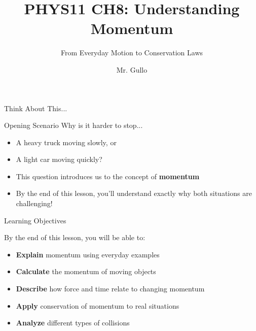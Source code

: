 \documentclass{beamer}
\title[Understanding Momentum]{PHYS11 CH8: Understanding Momentum}
\subtitle{From Everyday Motion to Conservation Laws}
\author[Mr. Gullo]{Mr. Gullo}
\date[]{}
\institute{}
\begin{document}
\begin{frame}
\titlepage
\end{frame}

\begin{frame}{Think About This...}
\begin{block}{Opening Scenario}
Why is it harder to stop...
\begin{itemize}
\item A heavy truck moving slowly, or
\item A light car moving quickly?
\end{itemize}
\end{block}
\begin{itemize}
\item This question introduces us to the concept of \textbf{momentum}
\item By the end of this lesson, you'll understand exactly why both situations are challenging!
\end{itemize}
\end{frame}

\begin{frame}{Learning Objectives}
\begin{block}{By the end of this lesson, you will be able to:}
\begin{itemize}
\item \textbf{Explain} momentum using everyday examples
\item \textbf{Calculate} the momentum of moving objects
\item \textbf{Describe} how force and time relate to changing momentum
\item \textbf{Apply} conservation of momentum to real situations
\item \textbf{Analyze} different types of collisions
\end{itemize}
\end{block}
\end{frame}
\end{document}
